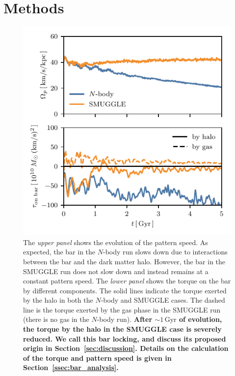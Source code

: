 \documentclass[twocolumn,linenumbers,trackchanges]{aastex631}
\newcommand{\Nbody}{$N$-body}
\newcommand{\SMUGGLE}{SMUGGLE}
\begin{document}

\section{Methods}
\label{sec:methods}
\begin{figure}
    \centering
    \includegraphics[width=\columnwidth]{fig/ps_torque.pdf}
    \caption{The \textit{upper panel} shows the evolution of the pattern speed.
    As expected, the bar in the \Nbody{} run slows down due to interactions
    between the bar and the dark matter halo. However, the bar in the \SMUGGLE{}
    run does not slow down and instead remains at a constant pattern speed. The
    \textit{lower panel} shows the torque on the bar by different components.
    The solid lines indicate the torque exerted by the halo in both the \Nbody{}
    and \SMUGGLE{} cases. The dashed line is the torque exerted by the gas phase
    in the \SMUGGLE{} run (there is no gas in the \Nbody{} run). {\bf After
    $\sim1\,\textrm{Gyr}$ of evolution, the torque by the halo in the \SMUGGLE{}
    case is severely reduced. We call this bar locking, and discuss its proposed
    origin in Section~\ref{sec:discussion}. Details on the calculation of the
    torque and pattern speed is given in
    Section~\ref{ssec:bar_analysis}.}}\label{fig:prop}
\end{figure}
\end{document}
